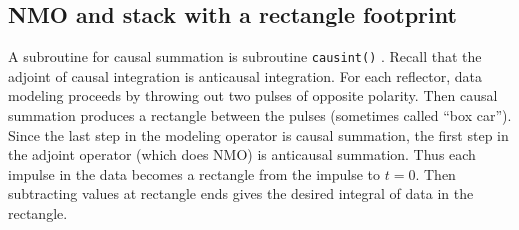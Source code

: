 \subsection{NMO and stack with a rectangle footprint}

\par

A subroutine for causal summation is subroutine \texttt{causint()} .
Recall that the
adjoint of causal integration is anticausal integration.
For each reflector,
data modeling proceeds by throwing out two pulses of opposite polarity.
Then causal summation produces a rectangle between the pulses
(sometimes called ``box car'').
Since the last step in the modeling operator
is causal summation,
the first step in the adjoint operator (which does NMO) is
anticausal summation.
Thus each impulse in the data becomes a rectangle from the impulse to $t=0$.
Then subtracting values at rectangle ends gives the desired integral of data
in the rectangle.

\begin{comment}
The code is in subroutines {\tt boxmo()}
and {\tt boxstack()}.
The traveltime depth $\tau$ is denoted by {\tt z} in the code.
The inverse of the earth velocity $v(\tau)$,
called the slowness $s(\tau )$, is denoted by {\tt slow(iz)}.
\progdex{boxmo}{box footprint}

\par
To find the end points of the rectangular intervals,
given the vertical travel time,
I get the time {\tt t}, in the usual way.
Likewise I get the time, {\tt tp}, on the next further-out trace
for the ending location of the rectangle wavelet.
I introduce a parameter called {\tt antialias} that
can be used to increase or decrease the {\tt tp-t} gap.
Normally {\tt antialias=1.}

\par
Theoretical solutions to various problems lead to various
expressions for amplitude along the hyperbola.
I set the amplitude {\tt amp} by a complicated expression
that I do not defend or explain fully here but merely indicate that:
a ``divergence'' correction is in the factor $1/\sqrt{t}$;
a cosine like ``obliquity'' scale is $z/t$;
and the wavelet area must be conserved, so the height is
inversely proportional to the pulse width {\tt (itp - it)}.
Wavelet area is conserved to assure that after low-pass filtering,
the strength of a wave is independent of whether it straddled
two mesh points as $(.5,.5)$ or lay wholly on one of them as $(1,0)$.
\end{comment}

